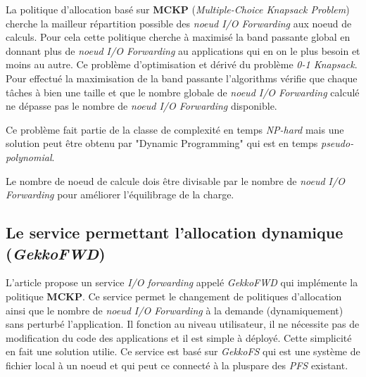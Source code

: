 \documentclass[10pt, a4paper]{article}
\begin{document}
La politique d'allocation basé sur \textbf{MCKP} (\emph{Multiple-Choice Knapsack Problem}) cherche la mailleur répartition possible des \emph{noeud I/O Forwarding} aux noeud de calculs.
Pour cela cette politique cherche à maximisé la band passante global en donnant plus de \emph{noeud I/O Forwarding} au applications qui en on le plus besoin et moins au autre. Ce problème d'optimisation et dérivé du problème \emph{0-1 Knapsack}.
Pour effectué la maximisation de la band passante l'algorithms vérifie que chaque tâches à bien une taille et que le nombre globale de \emph{noeud I/O Forwarding} calculé ne dépasse pas le nombre de \emph{noeud I/O Forwarding} disponible.

Ce problème fait partie de la classe de complexité en temps \emph{NP-hard} mais une solution peut être obtenu par "Dynamic Programming" qui est en temps \emph{pseudo-polynomial}.

Le nombre de noeud de calcule dois être divisable par le nombre de \emph{noeud I/O Forwarding} pour améliorer l'équilibrage de la charge.


\subsection{Le service permettant l'allocation dynamique (\emph{GekkoFWD})}

L'article propose un service \emph{I/O forwarding} appelé \emph{GekkoFWD} qui
implémente la politique \textbf{MCKP}. Ce service permet le changement de politiques d'allocation ainsi que le nombre de \emph{noeud I/O Forwarding} à la demande (dynamiquement) sans perturbé l'application. Il fonction au niveau utilisateur, il ne nécessite pas de modification du code des applications et il est simple à déployé. Cette simplicité en fait une solution utilie.
Ce service est basé sur \emph{GekkoFS} qui est une système de fichier local à un noeud et qui peut ce connecté à la pluspare des \emph{PFS} existant.
\end{document}

